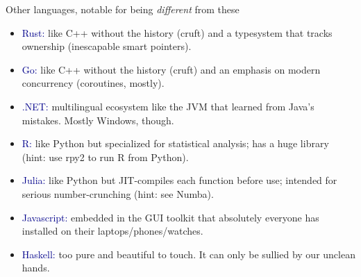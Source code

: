 \documentclass{beamer}
\begin{document}
\begin{frame}{Other languages, notable for being {\it different} from these}
\vspace{0.35 cm}
\begin{itemize}\setlength{\itemsep}{0.18 cm}
\item<1-> \textcolor{darkblue}{Rust:} like C++ without the history (cruft) and a typesystem that tracks ownership (inescapable smart pointers).
\item<2-> \textcolor{darkblue}{Go:} like C++ without the history (cruft) and an emphasis on modern concurrency (coroutines, mostly).
\item<3-> \textcolor{darkblue}{.NET:} multilingual ecosystem like the JVM that learned from Java's mistakes. Mostly Windows, though.
\item<4-> \textcolor{darkblue}{R:} like Python but specialized for statistical analysis; has a huge library (hint: use rpy2 to run R from Python).
\item<5-> \textcolor{darkblue}{Julia:} like Python but JIT-compiles each function before use; intended for serious number-crunching (hint: see Numba).
\item<6-> \textcolor{darkblue}{Javascript:} embedded in the GUI toolkit that absolutely everyone has installed on their laptops/phones/watches.
\item<7-> \textcolor{darkblue}{Haskell:} too pure and beautiful to touch. It can only be sullied by our unclean hands.
\end{itemize}
\end{frame}
\end{document}
